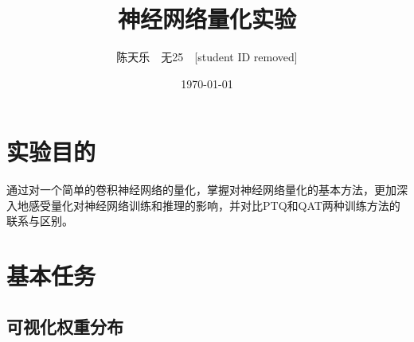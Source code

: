 \documentclass[UTF8]{ctexart}
\title{\textbf{神经网络量化实验}}
\author{陈天乐\ \ 无25\ \ [student ID removed] }
\date{\today}
\begin{document}
\maketitle
\tableofcontents
\newpage
\section{实验目的}
通过对一个简单的卷积神经网络的量化，掌握对神经网络量化的基本方法，更加深入地感受量化对神经网络训练和推理的影响，并对比PTQ和QAT两种训练方法的联系与区别。

\section{基本任务}
\subsection{可视化权重分布}
\end{document}
